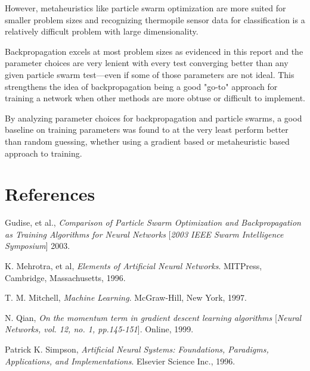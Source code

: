 \documentclass[a4paper,12pt]{article}
\begin{document}
However, metaheuristics like particle swarm optimization are more suited for smaller problem sizes and recognizing thermopile sensor data for classification is a relatively difficult problem with large dimensionality.

Backpropagation excels at most problem sizes as evidenced in this report and the parameter choices are very lenient with every test converging better than any given particle swarm test---even if some of those parameters are not ideal. This strengthens the idea of backpropagation being a good "go-to" approach for training a network when other methods are more obtuse or difficult to implement.

By analyzing parameter choices for backpropagation and particle swarms, a good baseline on training parameters was found to at the very least perform better than random guessing, whether using a gradient based or metaheuristic based approach to training.

\section{References}

\noindent [1] Gudise, et al., \textit{Comparison of Particle Swarm Optimization and Backpropagation as Training Algorithms for Neural Networks} [\textit{2003 IEEE Swarm Intelligence Symposium}] 2003.

\vspace{3mm}

\noindent [2] K. Mehrotra, et al, \textit{Elements of Artificial Neural Networks}. MITPress, Cambridge, Massachusetts, 1996.

\vspace{3mm}

\noindent [3] T. M. Mitchell, \textit{Machine Learning}. McGraw-Hill, New York, 1997.

\vspace{3mm}

\noindent [4] N. Qian, \textit{On the momentum term in gradient descent learning algorithms} [\textit{Neural Networks, vol. 12, no. 1, pp.145-151}]. Online, 1999.

\vspace{3mm}

\noindent [5] Patrick K. Simpson, \textit{Artificial Neural Systems: Foundations, Paradigms, Applications, and Implementations}. Elsevier Science Inc., 1996.
\end{document}
